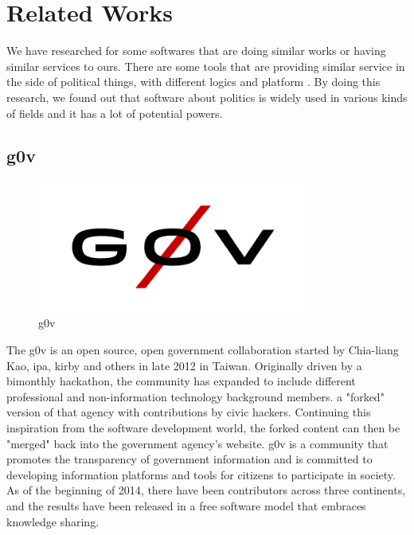 \documentclass[conference]{IEEEtran}
\begin{document}
   
   
   
   
    \vspace{300mm}

\section{Related Works}
We have researched for some softwares that are doing similar works or having similar services to ours. There are some tools that are providing similar service in the side of political things, with  different logics and platform . By doing this research, we found out that software about politics is widely used in various kinds of fields and it has a lot of potential powers.
 
\subsection{g0v}
  \begin{figure}[htbp]
    \centerline{\includegraphics[width=89mm, scale=0.5]{fig/111.png}}
    \caption{g0v}
    \label{fig}
    \end{figure}
The g0v is an open source, open government collaboration started by Chia-liang Kao, ipa, kirby and others in late 2012 in Taiwan. Originally driven by a bimonthly hackathon, the community has expanded to include different professional and non-information technology background members. a "forked" version of that agency with contributions by civic hackers. Continuing this inspiration from the software development world, the forked content can then be "merged" back into the government agency's website. g0v is a community that promotes the transparency of government information and is committed to developing information platforms and tools for citizens to participate in society. As of the beginning of 2014, there have been contributors across three continents, and the results have been released in a free software model that embraces knowledge sharing.
\\
\\
 
\end{document}
